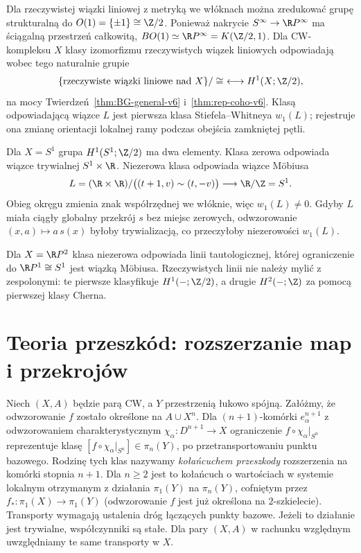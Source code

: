 \begin{przyklad}
\label{prz:BO1-h1-mobius-v6}
Dla rzeczywistej wiązki liniowej z metryką we włóknach
można zredukować grupę strukturalną do
$O(1)=\{\pm1\}\cong\Z/2$. Ponieważ nakrycie
$S^\infty\to\R P^\infty$ ma ściągalną przestrzeń całkowitą,
$BO(1)\simeq\R P^\infty=K(\Z/2,1)$.
Dla CW-kompleksu $X$ klasy izomorfizmu rzeczywistych
wiązek liniowych odpowiadają wobec tego naturalnie grupie
\[
\{\text{rzeczywiste wiązki liniowe nad }X\}/\cong
\ \longleftrightarrow H^1(X;\Z/2),
\]
na mocy Twierdzeń~\ref{thm:BG-general-v6}
i~\ref{thm:rep-coho-v6}. Klasą odpowiadającą wiązce
$L$ jest pierwsza klasa Stiefela--Whitneya $w_1(L)$;
rejestruje ona zmianę orientacji lokalnej ramy podczas
obejścia zamkniętej pętli.

Dla $X=S^1$ grupa $H^1(S^1;\Z/2)$ ma dwa elementy.
Klasa zerowa odpowiada wiązce trywialnej $S^1\times\R$.
Niezerowa klasa odpowiada wiązce Möbiusa
\[
L=(\R\times\R)/\bigl((t+1,v)\sim(t,-v)\bigr)
\longrightarrow \R/\Z=S^1.
\]
Obieg okręgu zmienia znak współrzędnej we włóknie,
więc $w_1(L)\ne0$. Gdyby $L$ miała ciągły globalny
przekrój $s$ bez miejsc zerowych, odwzorowanie
$(x,a)\mapsto a\,s(x)$ byłoby trywializacją, co
przeczyłoby niezerowości $w_1(L)$.

Dla $X=\R P^2$ klasa niezerowa odpowiada
linii tautologicznej, której ograniczenie do
$\R P^1\cong S^1$ jest wiązką Möbiusa.
Rzeczywistych linii nie należy mylić z zespolonymi:
te pierwsze klasyfikuje $H^1(-;\Z/2)$, a drugie
$H^2(-;\Z)$ za pomocą pierwszej klasy Cherna.
\end{przyklad}

\section{Teoria przeszkód: rozszerzanie map i przekrojów}
\begin{definicja}
Niech $(X,A)$ będzie parą CW, a $Y$ przestrzenią
łukowo spójną. Załóżmy, że odwzorowanie $f$ zostało określone
na $A\cup X^n$. Dla $(n+1)$-komórki
$e_\alpha^{n+1}$ z odwzorowaniem charakterystycznym
$\chi_\alpha:D^{n+1}\to X$ ograniczenie
$f\circ\chi_\alpha|_{S^n}$ reprezentuje klasę
$[f\circ\chi_\alpha|_{S^n}]\in\pi_n(Y)$,
po przetransportowaniu punktu bazowego.
Rodzinę tych klas nazywamy \emph{kołańcuchem przeszkody}
rozszerzenia na komórki stopnia $n+1$.
Dla $n\ge2$ jest to kołańcuch o wartościach
w systemie lokalnym otrzymanym z działania
$\pi_1(Y)$ na $\pi_n(Y)$, cofniętym przez
$f_*:\pi_1(X)\to\pi_1(Y)$ (odwzorowanie $f$ jest już
określona na $2$-szkielecie). Transporty wymagają
ustalenia dróg łączących punkty bazowe. Jeżeli
to działanie jest trywialne, współczynniki są stałe.
Dla pary $(X,A)$ w rachunku względnym uwzględniamy
te same transporty w $X$.
\end{definicja}

